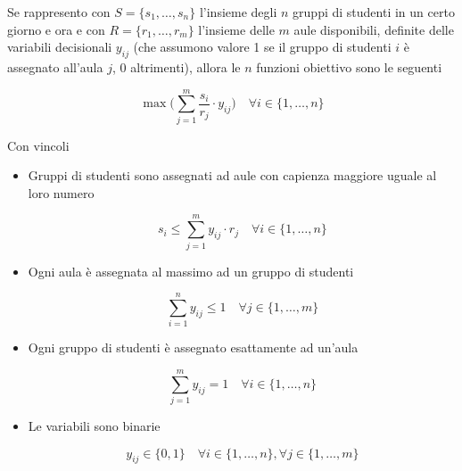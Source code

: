 Se rappresento con $S = \{s_1, \dots, s_n\}$ l'insieme degli $n$  gruppi di studenti in un certo giorno e ora e con 
$R = \{r_1, \dots, r_m\}$ l'insieme
delle $m$  aule disponibili, definite delle variabili decisionali $y_{ij}$ (che assumono valore 1 se il 
gruppo di studenti $i$ è assegnato all'aula $j$, 0 altrimenti), allora le $n$  funzioni obiettivo 
sono le seguenti 

\begin{equation}
    \max \bigg( \sum_{j = 1}^{m}\frac{s_i}{r_j} \cdot y_{ij} \bigg) \quad \forall i \in \{1, \dots, n\}
    \label{eq:objs}
\end{equation}

Con vincoli

\begin{itemize}
    \item Gruppi di studenti sono assegnati ad aule con capienza maggiore uguale al loro numero

    \begin{equation}
        s_i \leq \sum_{j=1}^{m} y_{ij} \cdot r_j \quad \forall i \in \{1, \dots, n\}
        \label{eq:constraint_capacity}
    \end{equation}

    \item Ogni aula è assegnata al massimo ad un gruppo di studenti
    
    \begin{equation}
        \sum_{i=1}^{n} y_{ij} \leq 1 \quad \forall j \in \{1, \dots, m\}
        \label{eq:constraint_rooms}
    \end{equation}

    \item Ogni gruppo di studenti è assegnato esattamente ad un'aula
    
    \begin{equation}
        \sum_{j=1}^{m} y_{ij} = 1 \quad \forall i \in \{1, \dots, n\}
        \label{eq:constraint_students}
    \end{equation}
    
    \item Le variabili sono binarie
    
    \begin{equation}
        y_{ij} \in \{0,1\} \quad \forall i \in \{1,\dots, n\}, \forall j \in \{1, \dots, m\}
        \label{eq:_constraint_binary}
    \end{equation}
    
\end{itemize}

